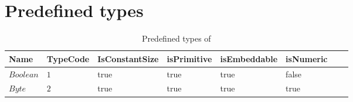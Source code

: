 \section{Predefined types}
\label{sec:appendix:predeftypes}

\begin{table}[h]
    \small
    \begin{tabu}{|l |l |l |l |l |l |l |l|}
     \hline
     \rowfont{\bfseries}
        Name   &   TypeCode   &  IsConstantSize & isPrimitive & isEmbeddable  & isNumeric  \\
     \hline
        $Boolean$	&	$1$ 	&	true	&	true	&	true	&	false	  \\
     \hline
         $Byte$	&	$2$	&	true	& true	&	true	&	true	\\
    \hline
    \end{tabu}
    \caption{Predefined types of \langname}
    \label{table:predeftypes}
\end{table}

